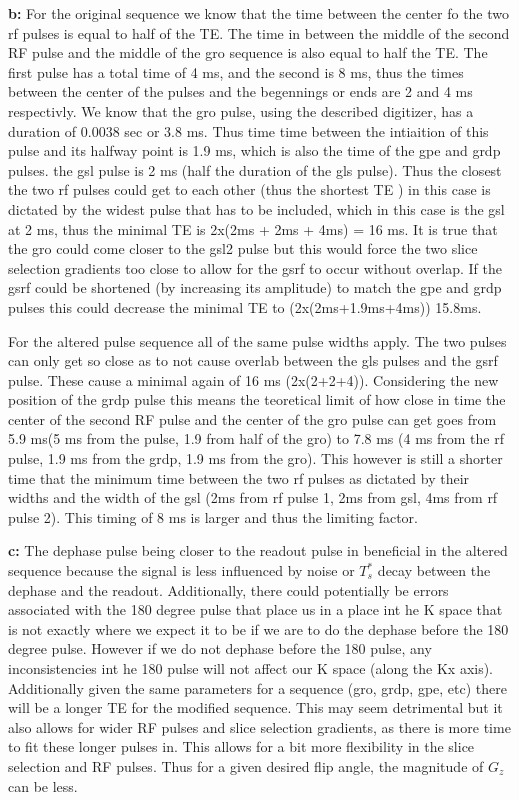 \documentclass[12pt]{article}
\begin{document}
\noindent\textbf{b: }
For the original sequence we know that the time between the center fo the two rf pulses is equal to half of the TE. The time in between the middle of the second RF pulse and the middle of the gro sequence is also equal to half the TE. The first pulse has a total time of 4 ms, and the second is 8 ms, thus the times between the center of the pulses and the begennings or ends are 2 and 4 ms respectivly. We know that the gro pulse, using the described digitizer, has a duration of 0.0038 sec or 3.8 ms. Thus time time between the intiaition of this pulse and its halfway point is 1.9 ms, which is also the time of the gpe and grdp pulses. the gsl pulse is 2 ms (half the duration of the gls pulse). Thus the closest the two rf pulses could get to each other (thus the shortest TE ) in this case is dictated by the widest pulse that has to be included, which in this case is the gsl at 2 ms, thus the minimal TE is 2x(2ms + 2ms + 4ms) = 16 ms. It is true that the gro could come closer to the gsl2 pulse but this would force the two slice selection gradients too close to allow for the gsrf to occur without overlap. If the gsrf could be shortened (by increasing its amplitude) to match the gpe and grdp pulses this could decrease the minimal TE to (2x(2ms+1.9ms+4ms)) 15.8ms.

For the altered pulse sequence all of the same pulse widths apply. The two pulses can only get so close as to not cause overlab between the gls pulses and the gsrf pulse. These cause a minimal again of 16 ms (2x(2+2+4)). Considering the new position of the grdp pulse this means the teoretical limit of how close in time the center of the second RF pulse and the center of the gro pulse can get goes from 5.9 ms(5 ms from the pulse, 1.9 from half of the gro) to 7.8 ms (4 ms from the rf pulse, 1.9 ms from the grdp, 1.9 ms from the gro). This however is still a shorter time that the minimum time between the two rf pulses as dictated by their widths and the width of the gsl (2ms from rf pulse 1, 2ms from gsl, 4ms from rf pulse 2). This timing of 8 ms is larger and thus the limiting factor.

\noindent\textbf{c: }
The dephase pulse being closer to the readout pulse in beneficial in the altered sequence because the signal is less influenced by noise or $T_s^*$ decay between the dephase and the readout. Additionally, there could potentially be errors associated with the 180 degree pulse that place us in a place int he K space that is not exactly where we expect it to be if we are to do the dephase before the 180 degree pulse. However if we do not dephase before the 180 pulse, any inconsistencies int he 180 pulse will not affect our K space (along the Kx axis). Additionally given the same parameters for a sequence (gro, grdp, gpe, etc) there will be a longer TE for the modified sequence. This may seem detrimental but it also allows for wider RF pulses and slice selection gradients, as there is more time to fit these longer pulses in. This allows for a bit more flexibility in the slice selection and RF pulses. Thus for a given desired flip angle, the magnitude of $G_z$ can be less.
\end{document}
